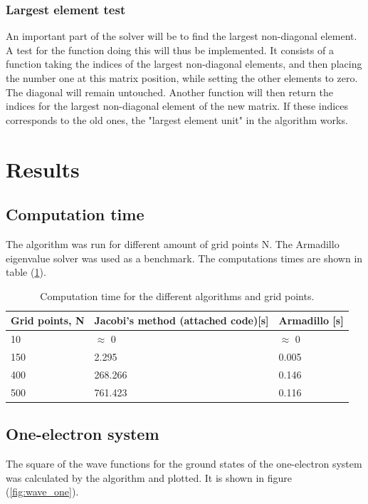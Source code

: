 \documentclass[10pt,a4paper,titlepage]{article}
\begin{document}
\subsubsection{Largest element test}
An important part of the solver will be to find the largest non-diagonal element. A test for the function doing this will thus be implemented. It consists of a function taking the indices of the largest non-diagonal elements, and then placing the number one at this matrix position, while setting the other elements to zero. The diagonal will remain untouched. Another function will then return the indices for the largest non-diagonal element of the new matrix. If these indices corresponds to the old ones, the "largest element unit" in the algorithm works. 


\section{Results}
\subsection{Computation time}
The algorithm was run for different amount of grid points N. The Armadillo eigenvalue solver was used as a benchmark. The computations times are shown in table (\ref{tab:Comptime}).

\begin{table}[!h]
\centering
\caption{Computation time for the different algorithms and grid points.}
\label{tab:Comptime}
\begin{tabular}{|l|l|l|}
\hline
\bf Grid points, N    &\bf Jacobi's method (attached code)[s]&\bf Armadillo [s]\\ \hline
10   &   $\approx$ 0       &  $\approx$ 0\\ \hline
150  &  2.295      &  0.005\\ \hline
400 &   268.266       &  0.146\\ \hline
500 &   761.423      &  0.116 \\ \hline
\end{tabular}
\end{table}




\subsection{One-electron system}
The square of the wave functions for the ground states of the one-electron system was calculated by the algorithm and plotted. It is shown in figure (\ref{fig:wave_one}).
\end{document}
